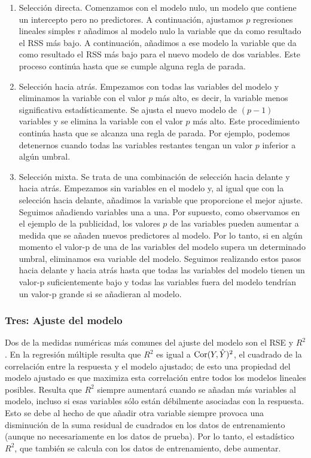 \begin{enumerate}[1.]
    \item Selección directa. Comenzamos con el modelo nulo, un modelo que contiene un intercepto pero no predictores. A continuación, ajustamos $p$ regresiones lineales simples r añadimos al modelo nulo la variable que da como resultado el RSS más bajo. A continuación, añadimos a ese modelo la variable que da como resultado el RSS más bajo para el nuevo modelo de dos variables. Este proceso continúa hasta que se cumple alguna regla de parada.
    \item Selección hacia atrás. Empezamos con todas las variables del modelo y eliminamos la variable con el valor $p$ más alto, es decir, la variable menos significativa estadísticamente. Se ajusta el nuevo modelo de $(p - 1)$ variables y se elimina la variable con el valor $p$ más alto. Este procedimiento continúa hasta que se alcanza una regla de parada. Por ejemplo, podemos detenernos cuando todas las variables restantes tengan un valor $p$ inferior a algún umbral.
    \item Selección mixta. Se trata de una combinación de selección hacia delante y hacia atrás. Empezamos sin variables en el modelo y, al igual que con la selección hacia delante, añadimos la variable que proporcione el mejor ajuste. Seguimos añadiendo variables una a una. Por supuesto, como observamos en el ejemplo de la publicidad, los valores $p$ de las variables pueden aumentar a medida que se añaden nuevos predictores al modelo. Por lo tanto, si en algún momento el valor-p de una de las variables del modelo supera un determinado umbral, eliminamos esa variable del modelo. Seguimos realizando estos pasos hacia delante y hacia atrás hasta que todas las variables del modelo tienen un valor-p suficientemente bajo y todas las variables fuera del modelo tendrían un valor-p grande si se añadieran al modelo.
\end{enumerate}

\subsubsection{Tres: Ajuste del modelo}
Dos de la medidas numéricas más comunes del ajuste del modelo son el RSE y $R^2$. En la regresión múltiple resulta que $R^2$ es igual a $\mathop{\mbox{\normalfont Cor}}\nolimits(Y,\hat{Y})^2$, el cuadrado de la correlación entre la respuesta y el modelo ajustado; de esto una propiedad del modelo ajustado es que maximiza esta correlación entre todos los modelos lineales posibles. Resulta que $R^2$ siempre aumentará cuando se añadan más variables al modelo, incluso si esas variables sólo están débilmente asociadas con la respuesta. Esto se debe al hecho de que añadir otra variable siempre provoca una disminución de la suma residual de cuadrados en los datos de entrenamiento (aunque no necesariamente en los datos de prueba). Por lo tanto, el estadístico $R^2$, que también se calcula con los datos de entrenamiento, debe aumentar. 

